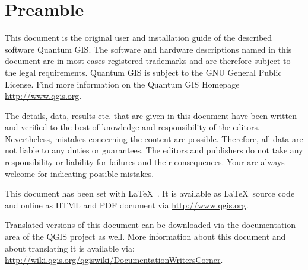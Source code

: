 \thispagestyle{empty}
\section*{Preamble}

\updatedisclaimer

\vspace{1cm}

This document is the original user and installation guide of the described 
software Quantum GIS. The software and hardware descriptions named in this 
document are in most cases registered trademarks and are therefore subject 
to the legal requirements. Quantum GIS is subject to the GNU General Public 
License. Find more information on the Quantum GIS Homepage \url{http://www.qgis.org}.

The details, data, results etc. that are given in this document have been 
written and verified to the best of knowledge and responsibility of the 
editors. Nevertheless, mistakes concerning the content are possible. 
Therefore, all data are not liable to any duties or guarantees. The editors 
and publishers do not take any responsibility or liability for failures and 
their consequences. Your are always welcome for indicating possible mistakes.

This document has been set with \LaTeX~. It is available as \LaTeX~source 
code and online as HTML and PDF document via \url{http://www.qgis.org}.

Translated versions of this document can be downloaded via the documentation 
area of the QGIS project as well. More information about this document and 
about translating it is available via: \\
\url{http://wiki.qgis.org/qgiswiki/DocumentationWritersCorner}. 

